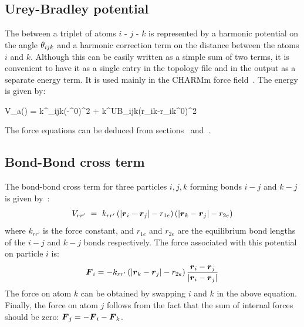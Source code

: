 \subsection{Urey-Bradley potential}
\label{subsec:Urey-Bradley}
The  between a triplet
of atoms $i$ - $j$ - $k$ is represented by a harmonic potential on the
angle $\theta_{ijk}$ and a harmonic correction term on the distance between
the atoms $i$ and $k$. Although this can be easily written as a simple
sum of two terms, it is convenient to have it as a single entry in the
topology file and in the output as a separate energy term. It is used mainly
in the CHARMm force field~\cite{BBrooks83}. The energy is given by:

\beq
V_a(\tijk) = \half k^{\theta}_{ijk}(\tijk-\tijk^0)^2 + \half k^{UB}_{ijk}(r_{ik}-r_{ik}^0)^2
\eeq

The force equations can be deduced from sections~
and~.

\subsection{Bond-Bond cross term}
\label{subsec:bondbondcross}
The bond-bond cross term for three particles $i, j, k$ forming bonds
$i-j$ and $k-j$ is given by~\cite{Lawrence2003b}:
\begin{equation}
V_{rr'} ~=~ k_{rr'} \left(\left|\mbox{\boldmath ${r}$}_{i}-\mbox{\boldmath ${r}$}_j\right|-r_{1e}\right) \left(\left|\mbox{\boldmath ${r}$}_{k}-\mbox{\boldmath ${r}$}_j\right|-r_{2e}\right)
\label{crossbb}
\end{equation}
where $k_{rr'}$ is the force constant, and $r_{1e}$ and $r_{2e}$ are the
equilibrium bond lengths of the $i-j$ and $k-j$ bonds respectively. The force
associated with this potential on particle $i$ is:
\begin{equation}
\mbox{\boldmath ${F}$}_{i} = -k_{rr'}\left(\left|\mbox{\boldmath ${r}$}_{k}-\mbox{\boldmath ${r}$}_j\right|-r_{2e}\right)\frac{\mbox{\boldmath ${r}$}_i-\mbox{\boldmath ${r}$}_j}{\left|\mbox{\boldmath ${r}$}_{i}-\mbox{\boldmath ${r}$}_j\right|}
\end{equation}
The force on atom $k$ can be obtained by swapping $i$ and $k$ in the above
equation. Finally, the force on atom $j$ follows from the fact that the sum
of internal forces should be zero: $\mbox{\boldmath ${F}$}_j = -\mbox{\boldmath ${F}$}_i-\mbox{\boldmath ${F}$}_k$.

